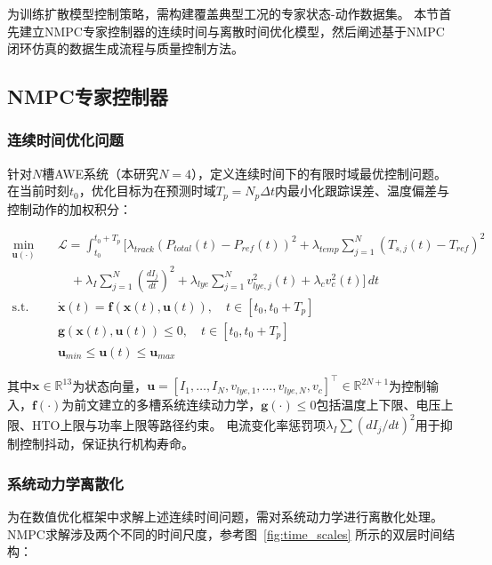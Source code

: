 为训练扩散模型控制策略，需构建覆盖典型工况的专家状态-动作数据集。
本节首先建立NMPC专家控制器的连续时间与离散时间优化模型，然后阐述基于NMPC闭环仿真的数据生成流程与质量控制方法。

\subsection{NMPC专家控制器}

\subsubsection{连续时间优化问题}

针对$N$槽AWE系统（本研究$N=4$），定义连续时间下的有限时域最优控制问题。
在当前时刻$t_0$，优化目标为在预测时域$T_p = N_p \Delta t$内最小化跟踪误差、温度偏差与控制动作的加权积分：

\begin{align}
  \min_{\mathbf{u}(\cdot)} \quad & \mathcal{L} = \int_{t_0}^{t_0+T_p} \Bigg[ \lambda_{track}\left(P_{total}(t) - P_{ref}(t)\right)^2 + \lambda_{temp}\sum_{j=1}^{N}\left(T_{s,j}(t) - T_{ref}\right)^2 \nonumber \\
  & \quad + \lambda_I \sum_{j=1}^{N}\left(\frac{dI_j}{dt}\right)^2 + \lambda_{lye} \sum_{j=1}^{N}v_{lye,j}^2(t) + \lambda_c v_c^2(t) \Bigg] \, dt \label{eq:mpc_continuous} \\
  \text{s.t.} \quad & \dot{\mathbf{x}}(t) = \mathbf{f}\left(\mathbf{x}(t), \mathbf{u}(t)\right), \quad t \in [t_0, t_0+T_p] \nonumber \\
  & \mathbf{g}\left(\mathbf{x}(t), \mathbf{u}(t)\right) \leq 0, \quad t \in [t_0, t_0+T_p] \nonumber \\
  & \mathbf{u}_{min} \leq \mathbf{u}(t) \leq \mathbf{u}_{max} \nonumber
\end{align}

其中$\mathbf{x} \in \mathbb{R}^{13}$为状态向量，$\mathbf{u} = [I_1, \ldots, I_N, v_{lye,1}, \ldots, v_{lye,N}, v_c]^\top \in \mathbb{R}^{2N+1}$为控制输入，$\mathbf{f}(\cdot)$为前文建立的多槽系统连续动力学，$\mathbf{g}(\cdot) \leq 0$包括温度上下限、电压上限、HTO上限与功率上限等路径约束。
电流变化率惩罚项$\lambda_I \sum (dI_j/dt)^2$用于抑制控制抖动，保证执行机构寿命。

\subsubsection{系统动力学离散化}

为在数值优化框架中求解上述连续时间问题，需对系统动力学进行离散化处理。
NMPC求解涉及两个不同的时间尺度，参考图~\ref{fig:time_scales} 所示的双层时间结构：

